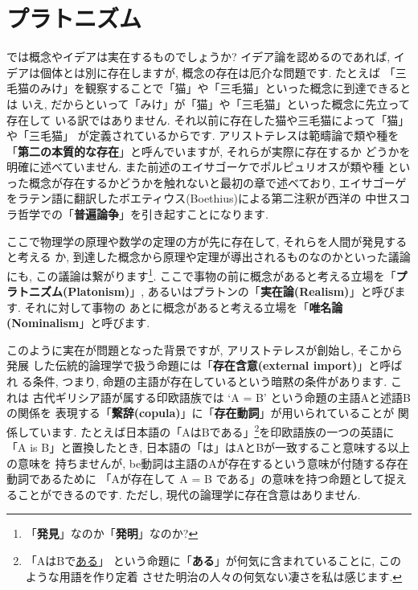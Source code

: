 \documentclass[b5j,8pt,twocolumn]{ltjsarticle}
\begin{document}
\section{プラトニズム}


では概念やイデアは実在するものでしょうか? イデア論を認めるのであれば,
 イデアは個体とは別に存在しますが, 概念の存在は厄介な問題です. たとえば
「三毛猫のみけ」を観察することで「猫」や「三毛猫」といった概念に到達できるとは
いえ, だからといって「みけ」が「猫」や「三毛猫」といった概念に先立って存在して
いる訳ではありません. それ以前に存在した猫や三毛猫によって「猫」や「三毛猫」
が定義されているからです. アリストテレスは範疇論で類や種を
「\textbf{第二の本質的な存在}」と呼んでいますが, それらが実際に存在するか
どうかを明確に述べていません. また前述のエイサゴーケでポルピュリオスが類や種
といった概念が存在するかどうかを触れないと最初の章で述べており, エイサゴーゲ
をラテン語に翻訳したボエティウス(Boethius)による第二注釈が西洋の
中世スコラ哲学での「\textbf{普遍論争}」を引き起すことになります\cite{普遍論争}.
\newline


ここで物理学の原理や数学の定理の方が先に存在して, それらを人間が発見すると考える
か, 到達した概念から原理や定理が導出されるものなのかといった議論にも,
 この議論は繋がります\footnote{「\textbf{発見}」なのか「\textbf{発明}」なのか?}.
 ここで事物の前に概念があると考える立場を「\textbf{プラトニズム(Platonism)}」,
 あるいはプラトンの「\textbf{実在論(Realism)}」と呼びます. それに対して事物の
あとに概念があると考える立場を「\textbf{唯名論(Nominalism}」と呼びます.
\newline


このように実在が問題となった背景ですが, アリストテレスが創始し, そこから発展
した伝統的論理学で扱う命題には「\textbf{存在含意(external import)}」と呼ばれ
る条件, つまり, 命題の主語が存在しているという暗黙の条件があります. これは
古代ギリシア語が属する印欧語族では `A = B' という命題の主語Aと述語Bの関係を
表現する「\textbf{繋辞(copula)}」に「\textbf{存在動詞}」が用いられていることが
関係しています. たとえば日本語の「AはBである」\footnote{「AはBで\underline{ある}」
という命題に「\textbf{ある}」が何気に含まれていることに, このような用語を作り定着
させた明治の人々の何気ない凄さを私は感じます.}を印欧語族の一つの英語に
「A is B」と置換したとき, 日本語の「は」はAとBが一致すること意味する以上の意味を
持ちませんが, be動詞は主語のAが存在するという意味が付随する存在動詞であるために
「Aが存在して A = B である」の意味を持つ命題として捉えることができるのです.
 ただし, 現代の論理学に存在含意はありません.
\newline 
\end{document}
